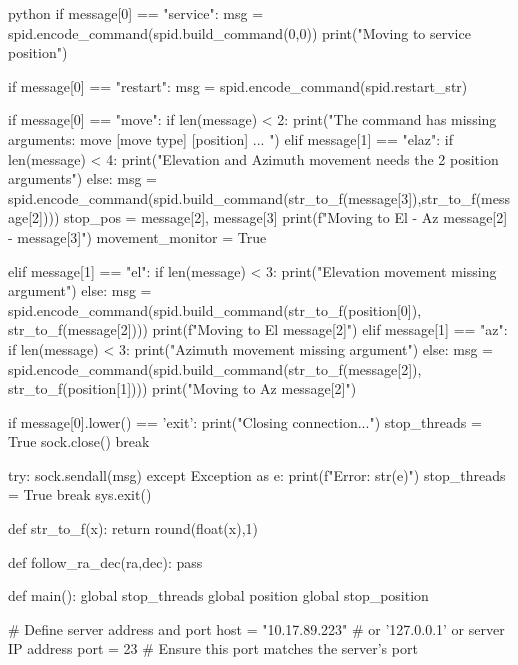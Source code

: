 \begin{sourcecode}[]{python}{}
        if message[0] == "service":
            msg = spid.encode_command(spid.build_command(0,0))
            print("Moving to service position")

        if message[0] == "restart":
            msg = spid.encode_command(spid.restart_str)

        if message[0] == "move":
            if len(message) < 2:
                print("The command has missing arguments: move [move type] [position] ... ")
            elif message[1] == "elaz":
                if len(message) < 4:
                    print("Elevation and Azimuth movement needs the 2 position arguments")
                else:
                    msg = spid.encode_command(spid.build_command(str_to_f(message[3]),str_to_f(message[2])))
                    stop_pos = message[2], message[3]
                    print(f"Moving to El - Az {message[2]} - {message[3]}")
                    movement_monitor = True

            elif message[1] == "el":
                if len(message) < 3:
                    print("Elevation movement missing argument")
                else:
                    msg = spid.encode_command(spid.build_command(str_to_f(position[0]), str_to_f(message[2])))
                    print(f"Moving to El {message[2]}")
            elif message[1] == "az":
                if len(message) < 3:
                    print("Azimuth movement missing argument")
                else:
                    msg = spid.encode_command(spid.build_command(str_to_f(message[2]), str_to_f(position[1])))
                    print("Moving to Az {message[2]}")

        if message[0].lower() == 'exit':
            print("Closing connection...")
            stop_threads = True
            sock.close()
            break

        try:
            sock.sendall(msg)
        except Exception as e:
            print(f"Error: {str(e)}")
            stop_threads = True
            break
    sys.exit()

def str_to_f(x):
    return round(float(x),1)

def follow_ra_dec(ra,dec):
    pass


def main():
    global stop_threads
    global position
    global stop_position

    # Define server address and port
    host = "10.17.89.223"  # or '127.0.0.1' or server IP address
    port = 23        # Ensure this port matches the server's port


\end{sourcecode}
